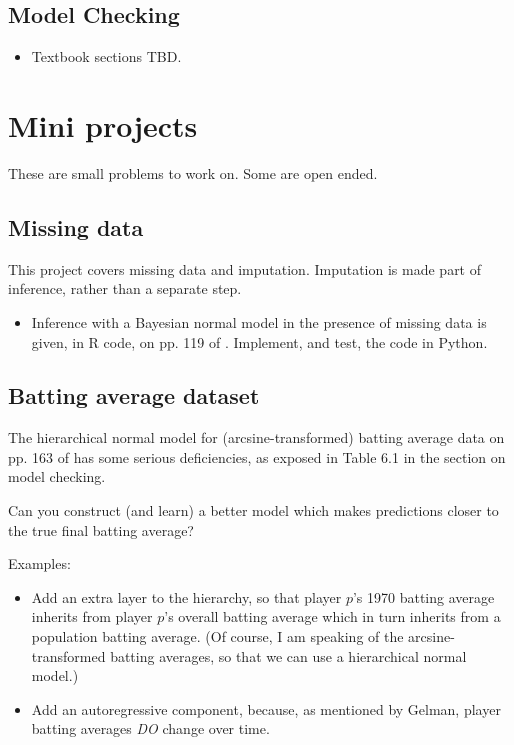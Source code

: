 \documentclass{article} %
\begin{document}
\subsection{Model Checking} 
\begin{itemize}
\item Textbook sections TBD. 
\end{itemize}

\section{Mini projects}

These are small problems to work on.  Some are open ended.

\subsection{Missing data}

This project covers missing data and imputation.  Imputation is made part of inference,  rather than a separate step. 

\begin{itemize}
\item  Inference with a Bayesian normal model in the presence of missing data is given,  in R code,  on pp. 119 of \cite{hoff2009first}.    Implement,  and test,  the code in Python.
\end{itemize}

\subsection{Batting average dataset}

The hierarchical normal model for (arcsine-transformed) batting average data on pp.  163 of \cite{gelman2013bayesian} has some serious deficiencies,  as exposed in Table 6.1 in the section on model checking.    

Can you construct (and learn) a better model which makes predictions closer to the true final batting average?
 
Examples:
\begin{itemize}
\item Add an extra layer to the hierarchy,  so that player $p$'s 1970 batting average inherits from player $p$'s overall batting average which in turn inherits from a population batting average.  (Of course,  I am speaking of the arcsine-transformed batting averages,  so that we can use a hierarchical normal model.)
\item Add an autoregressive component, because,  as mentioned by Gelman,  player batting averages \textit{DO} change over time. 
\end{itemize}
\end{document}
